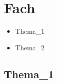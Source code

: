\section{Fach}
    \begin{itemize}
        \item {Thema_1}
        \item{Thema_2}
    \end{itemize}

    \subsection{Thema_1}
        

\newpage